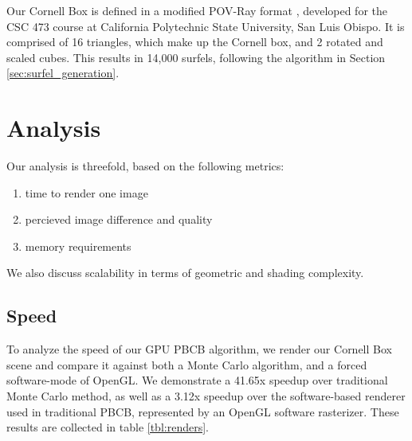 Our Cornell Box is defined in a modified POV-Ray format \cite{bib:povray}, developed for the CSC 473 course at California Polytechnic State University, San Luis Obispo. It is comprised of 16 triangles, which make up the Cornell box, and 2 rotated and scaled cubes. This results in 14,000 surfels, following the algorithm in Section \ref{sec:surfel_generation}.

\section{Analysis}
\label{sec:analysis}

\noindent Our analysis is threefold, based on the following metrics:
\begin{enumerate}
\item time to render one image
\item percieved image difference and quality
\item memory requirements
\end{enumerate}
\noindent We also discuss scalability in terms of geometric and shading complexity.

\subsection{Speed}
To analyze the speed of our GPU PBCB algorithm, we render our Cornell Box scene and compare it against both a Monte Carlo algorithm, and a forced software-mode of OpenGL. We demonstrate a 41.65x speedup over traditional Monte Carlo method, as well as a 3.12x speedup over the software-based renderer used in traditional PBCB, represented by an OpenGL software rasterizer. These results are collected in table \ref{tbl:renders}.

